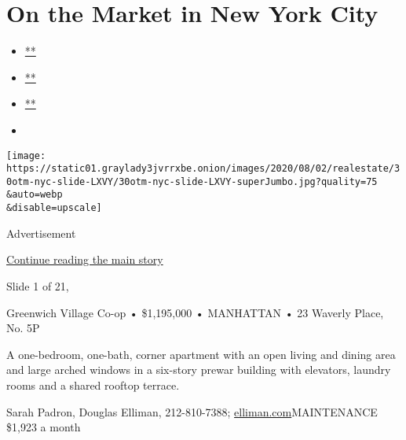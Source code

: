 \hypertarget{on-the-market-in-new-york-city}{%
\section{On the Market in New York
City}\label{on-the-market-in-new-york-city}}

\begin{itemize}
\item
  \href{https://www.facebookcorewwwi.onion/sharer.php?app_id=9869919170\&u=https\%3A\%2F\%2Fwww.nytimes3xbfgragh.onion\%2Fslideshow\%2F2020\%2F07\%2F30\%2Frealestate\%2Fon-the-market-in-new-york-city.html\%3Fsmid\%3Dfb-share\&name=On\%20the\%20Market\%20in\%20New\%20York\%20City\&redirect_uri=https\%3A\%2F\%2Fwww.facebookcorewwwi.onion\%2F}{**}
\item
  \href{https://twitter.com/intent/tweet?url=https\%3A\%2F\%2Fwww.nytimes3xbfgragh.onion\%2Fslideshow\%2F2020\%2F07\%2F30\%2Frealestate\%2Fon-the-market-in-new-york-city.html\%3Fsmid\%3Dtw-share\&text=On\%20the\%20Market\%20in\%20New\%20York\%20City}{**}
\item
  \href{mailto:?subject=nytimes3xbfgragh.onion\%3A\%20On\%20the\%20Market\%20in\%20New\%20York\%20City\&body=From\%20The\%20New\%20York\%20Times\%3A\%0A\%0AOn\%20the\%20Market\%20in\%20New\%20York\%20City\%0A\%0AThis\%20week\%E2\%80\%99s\%20properties\%20are\%20on\%20in\%20Greenwich\%20Village\%2C\%20Cobble\%20Hill\%20and\%20on\%20the\%20Grand\%20Concourse.\%0A\%0Ahttps\%3A\%2F\%2Fwww.nytimes3xbfgragh.onion\%2Fslideshow\%2F2020\%2F07\%2F30\%2Frealestate\%2Fon-the-market-in-new-york-city.html\%3Fsmid\%3Dem-share}{**}
\item
\end{itemize}

\texttt{[image: https://static01.graylady3jvrrxbe.onion/images/2020/08/02/realestate/30otm-nyc-slide-LXVY/30otm-nyc-slide-LXVY-superJumbo.jpg?quality=75\\\&auto=webp\\\&disable=upscale]}

Advertisement

\protect\hyperlink{after-right-0}{Continue reading the main story}

Slide 1 of 21,

Greenwich Village Co-op • \$1,195,000 • MANHATTAN • 23 Waverly Place,
No. 5P

A one-bedroom, one-bath, corner apartment with an open living and dining
area and large arched windows in a six-story prewar building with
elevators, laundry rooms and a shared rooftop terrace.

Sarah Padron, Douglas Elliman, 212-810-7388;
\href{https://www.nytimes3xbfgragh.onion/real-estate/usa/ny/new-york/greenwich-village/homes-for-sale/waverly-mews-23-waverly-pl/46-4121624?channel=sale}{elliman.com}MAINTENANCE
\$1,923 a month

